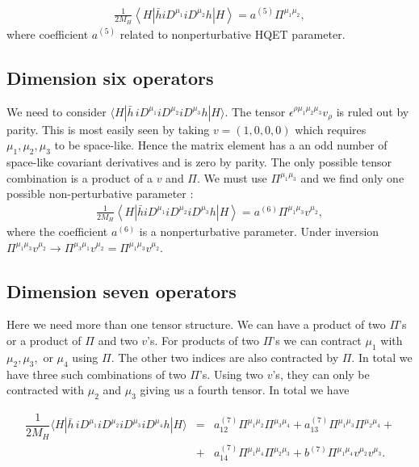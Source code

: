 \begin{eqnarray}\label{eqn:chap4_dim5_SI_decomp}
\frac{1}{2 M_{H}}\left\langle H\left|\bar{h} i D^{\mu_{1}} i D^{\mu_{2}} h\right| H\right\rangle= a^{(5)} \Pi^{\mu_{1} \mu_{2}},
\end{eqnarray}
where coefficient $a^{(5)}$ related to nonperturbative HQET parameter.
\subsection{Dimension six operators}\label{subsec:dim_6_SI}
We need to consider $\langle H |\bar h\, iD^{\mu_1}iD^{\mu_2}iD^{\mu_3}h|H\rangle$. The tensor $\epsilon^{\rho\mu_1\mu_2\mu_3} v_\rho$ is ruled out by parity. This is most easily seen by taking $v=(1,0,0,0)$ which requires $\mu_1,\mu_2,\mu_3$ to be space-like. Hence the matrix element has a an odd number of space-like covariant derivatives and  is zero by parity.  The only possible tensor combination is a product of a $v$ and $\Pi$. We must use $\Pi^{\mu_1\mu_3}$ and we find only one possible non-perturbative parameter \cite{Gunawardana:2017zix}:
\begin{eqnarray}\label{eqn:chap4_dim6_SI_decomp}
\frac{1}{2 M_{H}}\left\langle H\left|\bar{h} i D^{\mu_{1}} i D^{\mu_{2}} i D^{\mu_{3}} h\right| H\right\rangle= a^{(6)} \Pi^{\mu_{1} \mu_{3}} v^{\mu_{2}},
\end{eqnarray}
where the coefficient $a^{(6)}$ is a nonperturbative parameter. Under inversion $\Pi^{\mu_1\mu_3}v^{\mu_2}\to\Pi^{\mu_3\mu_1}v^{\mu_2}=\Pi^{\mu_1\mu_3}v^{\mu_2}$.
\subsection{Dimension seven operators}\label{subsec:dim7_SI_decomp}
Here we need more than one tensor structure. We can have a product of two $\Pi$'s or a product of $\Pi$ and two $v$'s. For products of two $\Pi$'s  we can contract $\mu_1$ with $\mu_2,\mu_3,$ or $\mu_4$ using $\Pi$. The other two indices are also contracted  by $\Pi$. In total we have three such combinations of two $\Pi$'s. Using two $v$'s, they can only be contracted  with $\mu_2$ and $\mu_3$ giving us a fourth tensor. In total we have

\begin{eqnarray}\label{eqn:chap4_SI_decomp}
\dfrac1{2M_H}\langle H |\bar h\, iD^{\mu_1}iD^{\mu_2}iD^{\mu_3}iD^{\mu_4}h|H\rangle&=&a_{12}^{(7)}\Pi^{\mu_1\mu_2}\Pi^{\mu_3\mu_4}+a_{13}^{(7)}\Pi^{\mu_1\mu_3}\Pi^{\mu_2\mu_4}+\nonumber\\
&+&a_{14}^{(7)}\Pi^{\mu_1\mu_4}\Pi^{\mu_2\mu_3}+b^{(7)}\Pi^{\mu_1\mu_4}v^{\mu_2} v^{\mu_3}. 
\end{eqnarray}

